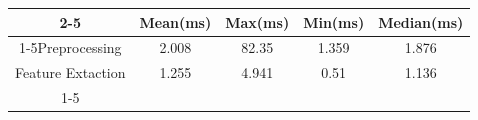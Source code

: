 \documentclass{standalone}
\begin{document}
 
 \begin{tabular}{|c |c |c |c |c |}
\cline{2-5}\cline{2-5} \multicolumn{1}{c |}{ } & Mean(ms) & Max(ms) & Min(ms) & Median(ms)\\ 
\cline{1-5}Preprocessing & 2.008 & 82.35 & 1.359 & 1.876\\ 
 \hhline{|=|=|=|=|=|}Feature Extaction & 1.255 & 4.941 & 0.51 & 1.136\\ 
 \cline{1-5}\hline \end{tabular}
 
\end{document}
